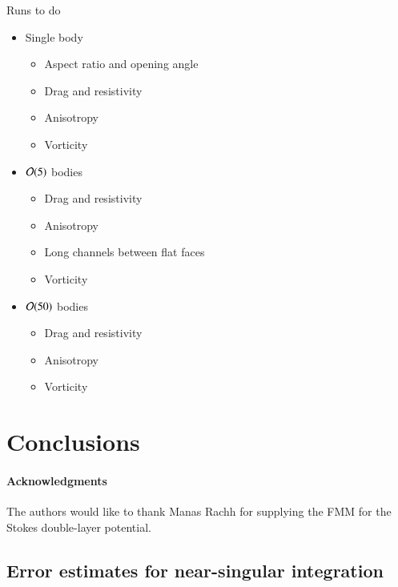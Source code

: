 \documentclass[preprint, 10pt]{elsarticle}
\begin{document}
\newpage


Runs to do
\begin{itemize}
  \item Single body
  \begin{itemize}
    \item Aspect ratio and opening angle
    \item Drag and resistivity
    \item Anisotropy
    \item Vorticity
  \end{itemize}
  \item ${\mathcal{O}}(5)$ bodies
  \begin{itemize}
    \item Drag and resistivity
    \item Anisotropy
    \item Long channels between flat faces
    \item Vorticity
  \end{itemize}
  \item ${\mathcal{O}}(50)$ bodies
  \begin{itemize}
    \item Drag and resistivity
    \item Anisotropy
    \item Vorticity
  \end{itemize}
\end{itemize}


\section{Conclusions\label{s:conclusions}}


\paragraph{\bf Acknowledgments} The authors would like to thank Manas Rachh
for supplying the FMM for the Stokes double-layer potential.


\begin{appendices}
\section{Error estimates for near-singular integration \label{A:AppendixA}} 
\end{appendices}


 

\end{document}
